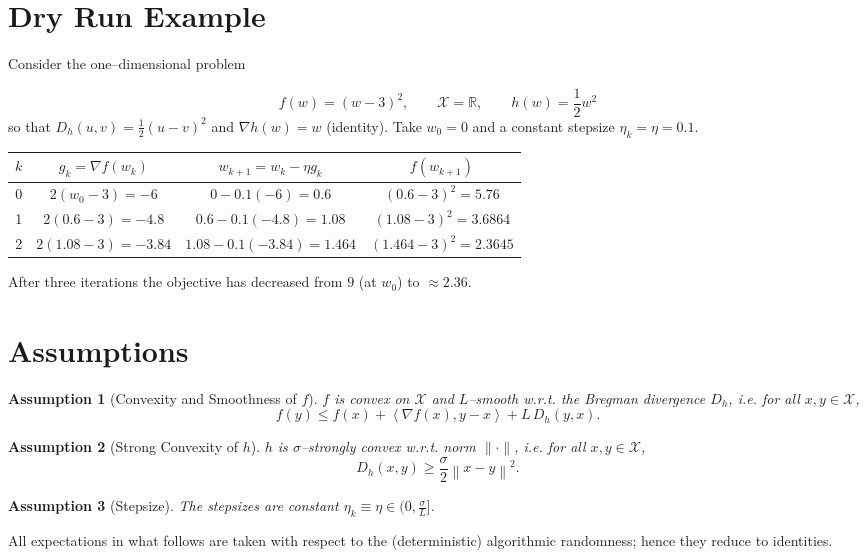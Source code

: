\documentclass{article}
\newtheorem{assumption}{Assumption}
\newcommand{\norm}[1]{\left\lVert #1\right\rVert}
\newcommand{\ip}[2]{\left\langle #1,#2\right\rangle}
\newcommand{\D}[2]{D_h(#1,#2)}
\newcommand{\grad}[1]{\nabla #1}
\begin{document}
\section*{Dry Run Example}
Consider the one–dimensional problem  

\[
f(w)=(w-3)^2,\qquad \mathcal{X}=\mathbb{R},\qquad h(w)=\frac12 w^{2}
\]
so that $D_h(u,v)=\frac12 (u-v)^2$ and $\grad{h}(w)=w$ (identity).  
Take $w_0=0$ and a constant stepsize $\eta_k=\eta=0.1$.

\begin{center}
\begin{tabular}{c|c|c|c}
$k$ & $g_k=\grad{f}(w_k)$ & $w_{k+1}=w_k-\eta g_k$ & $f(w_{k+1})$\\\hline
0 & $2(w_0-3)=-6$ & $0-0.1(-6)=0.6$ & $(0.6-3)^2=5.76$\\
1 & $2(0.6-3)=-4.8$ & $0.6-0.1(-4.8)=1.08$ & $(1.08-3)^2=3.6864$\\
2 & $2(1.08-3)=-3.84$ & $1.08-0.1(-3.84)=1.464$ & $(1.464-3)^2=2.3645$
\end{tabular}
\end{center}
After three iterations the objective has decreased from $9$ (at $w_0$) to $\approx2.36$.

\section*{Assumptions}
\begin{assumption}[Convexity and Smoothness of $f$]
\label{as:f}
$f$ is convex on $\mathcal{X}$ and $L$–smooth w.r.t. the Bregman divergence $D_h$, i.e. for all $x,y\in\mathcal{X}$,
\[
f(y)\le f(x)+\ip{\grad{f}(x)}{y-x}+L\,\D{y}{x}. \tag{A1}
\]
\end{assumption}
\begin{assumption}[Strong Convexity of $h$]
\label{as:h}
$h$ is $\sigma$–strongly convex w.r.t. norm $\|\cdot\|$, i.e. for all $x,y\in\mathcal{X}$,
\[
\D{x}{y}\ge\frac{\sigma}{2}\norm{x-y}^{2}. \tag{A2}
\]
\end{assumption}
\begin{assumption}[Stepsize]
\label{as:eta}
The stepsizes are constant $\eta_k\equiv\eta\in(0,\frac{\sigma}{L}]$.
\end{assumption}
All expectations in what follows are taken with respect to the (deterministic) algorithmic randomness; hence they reduce to identities.

\end{document}
